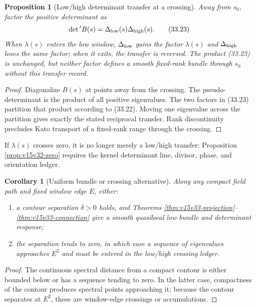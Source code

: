 \documentclass[11pt]{article}
\newtheorem{proposition}[theorem]{Proposition}
\newtheorem{corollary}[theorem]{Corollary}
\theoremstyle{remark}
\begin{document}
\begin{proposition}[Low/high determinant transfer at a crossing]
\label{prop:v15v33-crossing}
Away from \(s_0\), factor the positive determinant as
\[
 \det{}'B(s)
 =
 \Delta_{\rm low}(s)\Delta_{\rm high}(s).                  \tag{33.23}
\]
When \(\lambda(s)\) enters the low window,
\(\Delta_{\rm low}\) gains the factor \(\lambda(s)\) and
\(\Delta_{\rm high}\) loses the same factor; when it exits, the
transfer is reversed.  The product (33.23) is unchanged, but neither
factor defines a smooth fixed-rank bundle through \(s_0\) without
this transfer record.
\end{proposition}

\begin{proof}
Diagonalize \(B(s)\) at points away from the crossing.  The
pseudo-determinant is the product of all positive eigenvalues.
The two factors in (33.23) partition that product according to
(33.22).  Moving one eigenvalue across the partition gives exactly
the stated reciprocal transfer.  Rank discontinuity precludes Kato
transport of a fixed-rank range through the crossing.
\end{proof}

If \(\lambda(s)\) crosses zero, it is no longer merely a low/high
transfer: Proposition \ref{prop:v15v32-zero} requires the kernel
determinant line, divisor, phase, and orientation ledger.

\begin{corollary}[Uniform bundle or crossing alternative]
\label{cor:v15v33-alternative}
Along any compact field path and fixed window edge \(E\), either:
\begin{enumerate}
\item a contour separation \(\delta>0\) holds, and
      Theorems \ref{thm:v15v33-projection}--\ref{thm:v15v33-connection}
      give a smooth quasilocal low bundle and determinant response;
\item the separation tends to zero, in which case a sequence of
      eigenvalues approaches \(E^2\) and must be entered in the
      low/high crossing ledger.
\end{enumerate}
\end{corollary}

\begin{proof}
The continuous spectral distance from a compact contour is either
bounded below or has a sequence tending to zero.  In the latter
case, compactness of the contour produces spectral points
approaching it; because the contour separates at \(E^2\), these are
window-edge crossings or accumulations.
\end{proof}
\end{document}
